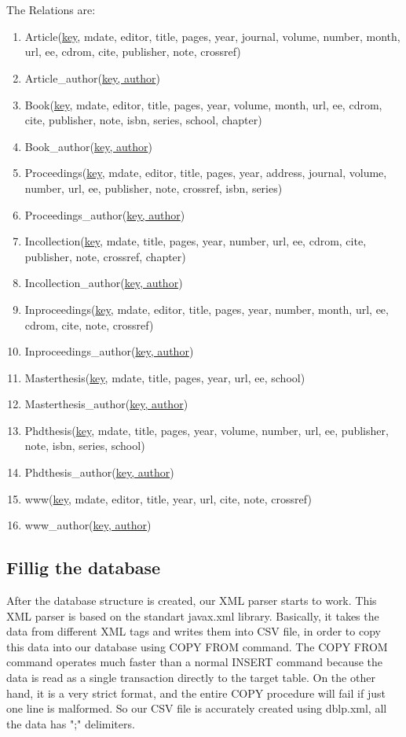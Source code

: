 \documentclass{acm_proc_article-sp}
\begin{document}
\\
\\The Relations are:
\begin{enumerate}
	\item Article(\underline{key}, mdate, editor, title, pages, year, journal, volume, number, month, url, ee, cdrom, cite, publisher, note, crossref)
	\item Article\_author(\underline{key, author})
	\item Book(\underline{key}, mdate, editor, title, pages, year, volume, month, url, ee, cdrom, cite, publisher, note, isbn, series, school, chapter)
	\item Book\_author(\underline{key, author})
	\item Proceedings(\underline{key}, mdate, editor, title, pages, year, address, journal, volume, number, url, ee, publisher, note, crossref, isbn, series)
	\item Proceedings\_author(\underline{key, author})
	\item Incollection(\underline{key}, mdate, title, pages, year, number, url, ee, cdrom, cite, publisher, note, crossref, chapter)
	\item Incollection\_author(\underline{key, author})
	\item Inproceedings(\underline{key}, mdate, editor, title, pages, year, number, month, url, ee, cdrom, cite, note, crossref)
	\item Inproceedings\_author(\underline{key, author})
	\item Masterthesis(\underline{key}, mdate, title, pages, year, url, ee, school)
	\item Masterthesis\_author(\underline{key, author})
	\item Phdthesis(\underline{key}, mdate, title, pages, year, volume, number, url, ee, publisher, note, isbn, series, school)
	\item Phdthesis\_author(\underline{key, author})
	\item www(\underline{key}, mdate, editor, title, year, url, cite, note, crossref)
	\item www\_author(\underline{key, author})
\end{enumerate}
\subsection{Fillig the database}
After the database structure is created, our XML parser starts to work. This XML parser is based on the standart javax.xml library. Basically, it takes the data from different XML tags and writes them into CSV file, in order to copy this data into our database using COPY FROM command. The COPY FROM command operates much faster than a normal INSERT command because the data is read as a single transaction directly to the target table. On the other hand, it is a very strict format, and the entire COPY procedure will fail if just one line is malformed\cite{copy}.	So our CSV file is accurately created using dblp.xml, all the data has ";" delimiters.
\end{document}
